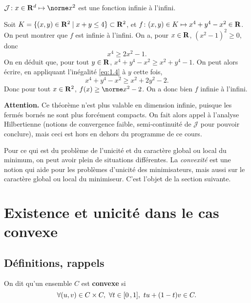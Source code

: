 \documentclass[grape]{../ceri/sty/MasterNotes}
\newcommand\J{\mathcal J}
\begin{document}
\begin{exs}
    \item $\J\colon x\in\R^d\mapsto\norme x^2$ est une fonction infinie à l'infini.
    \item Soit $K=\{(x,y)\in\mathbf{R}^2\mid x+y\le 4\}\subset\mathbf{R}^2$, et $f\colon (x,y)\in K\mapsto x^4+y^4-x^2\in\mathbf{R}$. On peut montrer que $f$ est infinie à l'infini. On a, pour $x\in\mathbf{R}$, $(x^2-1)^2\ge 0$, donc
    \begin{equation}
        x^4 \ge 2x^2-1.\label{eq:1.4}
    \end{equation}
    On en déduit que, pour tout $y\in\mathbf{R}$, $x^4+y^4-x^2\ge x^2 + y^4-1$. On peut alors écrire, en appliquant l'inégalité \eqref{eq:1.4} à $y$ cette fois,
    \[ x^4+y^4-x^2\ge x^2+2y^2-2. \]
    Donc pour tout $x\in\mathbf{R}^2$, $f(x)\ge \norme x^2-2$. On a donc bien $f$ infinie à l'infini.
\end{exs}

\begin{rem*}
    \textbf{Attention.} Ce théorème n'est plus valable en dimension infinie, puisque les fermés bornés ne sont plus forcément compacts. On fait alors appel à l'analyse Hilbertienne (notions de convergence faible, semi-continuité de $\J$ pour pouvoir conclure), mais ceci est hors en dehors du programme de ce cours.
\end{rem*}

Pour ce qui est du problème de l'unicité et du caractère global ou local du minimum, on peut avoir plein de situations différentes. La \textit{convexité} est une notion qui aide pour les problèmes d'unicité des minimisateurs, mais aussi sur le caractère global ou local du minimiseur. C'est l'objet de la section suivante.

\section{Existence et unicité dans le cas convexe}

\subsection{Définitions, rappels}

\begin{defin}
    On dit qu'un ensemble $C$ est \textbf{convexe} si
    \[ \forall (u,v)\in C\times C,\ \forall t\in\mathopen{[}0\mathclose{}\mathpunct{},1\mathclose{]},\ tu+(1-t)v\in C. \]
\end{defin}
\end{document}
